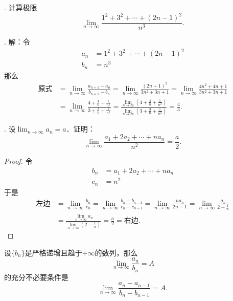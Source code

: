 . 计算极限
\begin{equation}
    \lim_{n\to\infty} \frac{1^2 + 3^2 + \cdots + (2n-1)^2}{n^3}.
\end{equation}

. 解：令
\begin{align}
    a_n &= 1^2 + 3^2 + \cdots + (2n-1)^2 \\
    b_n &= n^3
\end{align}
那么
\begin{align}
    \text{原式} &= \lim_{n \to \infty} \frac{a_{n+1}-a_n}{b_{n+1}-b_n} = \lim_{n \to \infty} \frac{(2n+1)^2}{3n^2 + 3n + 1} = \lim_{n \to \infty} \frac{4n^2 + 4n + 1}{3n^2 + 3n + 1} \\
    &= \lim_{n \to \infty} \frac{4 + \displaystyle\frac{4}{n} + \displaystyle\frac{1}{n^2}}{3 + \displaystyle\frac{3}{n} + \frac{1}{n^2}} = \frac{\displaystyle\lim_{n \to \infty} \left(4 + \displaystyle\frac{4}{n} + \displaystyle\frac{1}{n^2}\right)}{\displaystyle\lim_{n \to \infty} \left(3 + \displaystyle\frac{3}{n} + \displaystyle\frac{1}{n^2}\right)} = \frac{4}{3}.
\end{align}

. 设$\displaystyle\lim_{n \to \infty} a_n = a$．证明：
\begin{equation}
    \lim_{n \to \infty} \frac{a_1 + 2a_2 + \cdots + na_n}{n^2} = \frac{a}{2}.
\end{equation}

\begin{proof}
令
\begin{align}
    b_n &= a_1 + 2a_2 + \cdots + na_n \\
    c_n &= n^2
\end{align}
于是
\begin{align}
    \text{左边} &= \lim_{n \to \infty} \frac{b_n}{c_n} = \lim_{n \to \infty} \frac{b_{n} - b_{n-1}}{c_{n} - c_{n-1}} = \lim_{n \to \infty} \frac{n a_n}{2n - 1} = \lim_{n \to \infty} \frac{a_n}{2 - \displaystyle\frac{1}{n}} \\
    &= \frac{\displaystyle\lim_{n \to \infty} a_n}{\displaystyle\lim_{n \to \infty} \left(2 - \displaystyle\frac{1}{n}\right)} = \frac{a}{2} = \text{右边}.
\end{align}
\end{proof}

\begin{theo}[Stolz]
设$\{b_n \}$是严格递增且趋于$+\infty$的数列，那么
\begin{equation}
    \lim_{n \to \infty} \frac{a_n}{b_n} = A
\end{equation}
的充分不必要条件是
\begin{equation}
    \lim_{n \to \infty} \frac{a_n - a_{n-1}}{b_{n} - b_{n-1}} = A.
\end{equation}
\end{theo}

